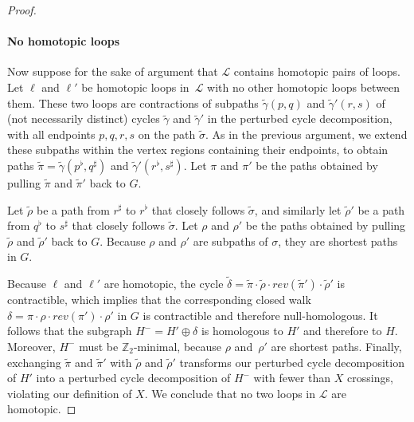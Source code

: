 \documentclass[letterpaper,review]{siamart190516}
\def\Z{\mathbb{Z}}
\def\reverse#1{\textit{rev}(#1)}
\def\jnote#1{\textcolor{orange}{Jeff: #1}}
\begin{document}
\begin{proof}
%
\medskip
\paragraph{\textbf{No homotopic loops}}
%
Now suppose for the sake of argument that $\mathcal{L}$ contains homotopic pairs of loops.  Let $\ell$ and $\ell'$ be homotopic loops in~$\mathcal{L}$ with no other homotopic loops between them.
These two loops are contractions of subpaths $\tilde\gamma(p, q)$ and $\tilde\gamma'(r,s)$ of (not necessarily distinct) cycles $\tilde\gamma$ and $\tilde\gamma'$ in the perturbed cycle decomposition, with all endpoints $p,q,r,s$ on the path $\tilde\sigma$.
%
As in the previous argument, we extend these subpaths within the vertex regions containing their endpoints, to obtain paths $\tilde\pi = \tilde\gamma(p^\flat, q^\sharp)$ and $\tilde\gamma'(r^\flat, s^\sharp)$.  Let $\pi$ and $\pi'$ be the paths obtained by pulling $\tilde\pi$ and $\tilde\pi'$ back to $G$.

Let $\tilde\rho$ be a path from $r^\sharp$ to $r^\flat$ that closely follows $\tilde\sigma$, and similarly let $\tilde\rho'$ be a path from $q^\flat$ to $s^\sharp$ that closely follows $\tilde\sigma$.  Let $\rho$ and $\rho'$ be the paths obtained by pulling $\tilde\rho$ and $\tilde\rho'$ back to $G$.  Because $\rho$ and $\rho'$ are subpaths of $\sigma$, they are shortest paths in $G$.

Because $\ell$ and $\ell'$ are homotopic, the cycle $\tilde\delta = \tilde\pi \cdot \tilde\rho \cdot \reverse{\tilde\pi'} \cdot \tilde\rho'$ is contractible, which implies that the corresponding closed walk $\delta = \pi\cdot\rho\cdot\reverse{\pi'}\cdot\rho'$ in $G$ is contractible and therefore null-homologous.  It follows that the subgraph $H^- = H'\oplus \delta$ is homologous to $H'$ and therefore to $H$.  Moreover, $H^-$ must be $\Z_2$-minimal, because $\rho$ and~$\rho'$ are shortest paths.
%
Finally, exchanging $\tilde\pi$ and $\tilde\pi'$ with $\tilde\rho$ and $\tilde\rho'$ transforms our perturbed cycle decomposition of $H'$ into a perturbed cycle decomposition of $H^-$ with fewer than $X$ crossings, violating our definition of $X$.  We conclude that no two loops in $\mathcal{L}$ are homotopic.
\end{proof}

\end{document}
